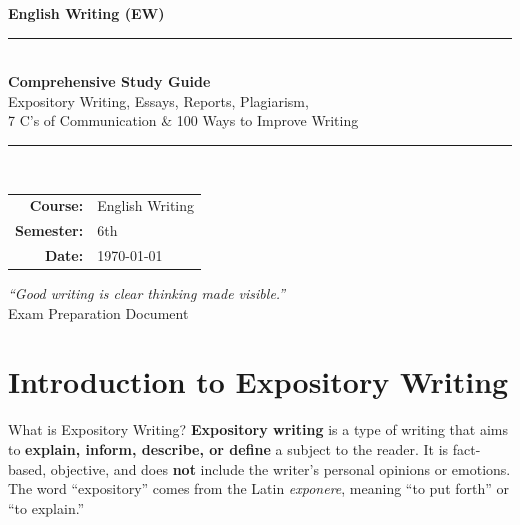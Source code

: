 \documentclass[12pt,a4paper]{article}
\begin{document}
\begin{titlepage}
\centering
\vspace*{1cm}
{\Large\color{primary}\textbf{English Writing (EW)}}\\[0.3cm]
\rule{\textwidth}{2pt}\\[0.5cm]
{\Huge\bfseries\color{primary} Comprehensive Study Guide}\\[0.3cm]
{\Large Expository Writing, Essays, Reports, Plagiarism,}\\[0.1cm]
{\Large 7 C's of Communication \& 100 Ways to Improve Writing}\\[0.2cm]
\rule{\textwidth}{2pt}\\[1.5cm]

\begin{tabular}{rl}
\textbf{Course:} & English Writing \\[0.3cm]
\textbf{Semester:} & 6th \\[0.3cm]
\textbf{Date:} & \today \\
\end{tabular}

\vfill
{\large \textit{``Good writing is clear thinking made visible.''}}\\[0.5cm]
{\large Exam Preparation Document}
\end{titlepage}

\tableofcontents
\newpage

\section{Introduction to Expository Writing}

\begin{keybox}{What is Expository Writing?}
\textbf{Expository writing} is a type of writing that aims to \textbf{explain, inform, describe, or define} a subject to the reader. It is fact-based, objective, and does \textbf{not} include the writer's personal opinions or emotions. The word ``expository'' comes from the Latin \textit{exponere}, meaning ``to put forth'' or ``to explain.''
\end{keybox}
\end{document}
